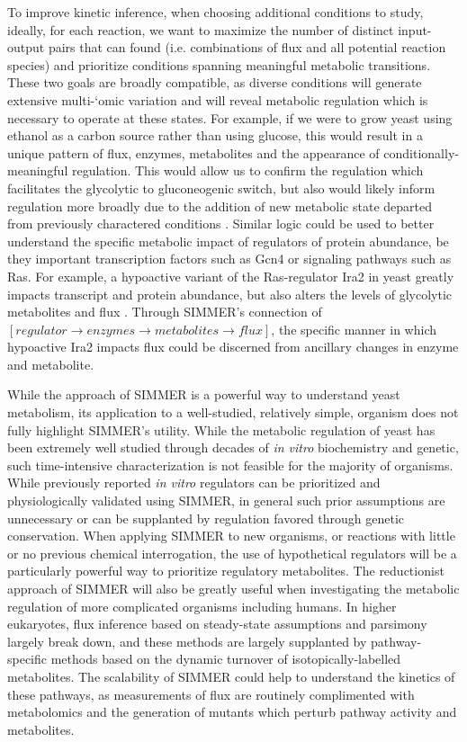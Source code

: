 To improve kinetic inference, when choosing additional conditions to study, ideally, for each reaction, we want to maximize the number of distinct input-output pairs that can found (i.e. combinations of flux and all potential reaction species) and prioritize conditions spanning meaningful metabolic transitions. These two goals are broadly compatible, as diverse conditions will generate extensive multi-`omic variation and will reveal metabolic regulation which is necessary to operate at these states. For example, if we were to grow yeast using ethanol as a carbon source rather than using glucose, this would result in a unique pattern of flux, enzymes, metabolites and the appearance of conditionally-meaningful regulation. This would allow us to confirm the regulation which facilitates the glycolytic to gluconeogenic switch, but also would likely inform regulation more broadly due to the addition of new metabolic state departed from previously charactered conditions \cite{Zampar:2013fr}. Similar logic could be used to better understand the specific metabolic impact of regulators of protein abundance, be they important transcription factors such as Gcn4 or signaling pathways such as Ras.  For example, a hypoactive variant of the Ras-regulator Ira2 in yeast greatly impacts transcript and protein abundance, but also alters the levels of glycolytic metabolites and flux \cite{Breunig:2014bu}. Through SIMMER's connection of $\left[regulator \rightarrow enzymes \rightarrow metabolites \rightarrow flux\right]$, the specific manner in which hypoactive Ira2 impacts flux could be discerned from ancillary changes in enzyme and metabolite. 

While the approach of SIMMER is a powerful way to understand yeast metabolism, its application to a well-studied, relatively simple, organism does not fully highlight SIMMER's utility. While the metabolic regulation of yeast has been extremely well studied through decades of \textit{in vitro} biochemistry and genetic, such time-intensive characterization is not feasible for the majority of organisms.  While previously reported \textit{in vitro} regulators can be prioritized and physiologically validated using SIMMER, in general such prior assumptions are unnecessary or can be supplanted by regulation favored through genetic conservation. When applying SIMMER to new organisms, or reactions with little or no previous chemical interrogation, the use of hypothetical regulators will be a particularly powerful way to prioritize regulatory metabolites. The reductionist approach of SIMMER will also be greatly useful when investigating the metabolic regulation of more complicated organisms including humans. In higher eukaryotes, flux inference based on steady-state assumptions and parsimony largely break down, and these methods are largely supplanted by pathway-specific methods based on the dynamic turnover of isotopically-labelled metabolites. The scalability of SIMMER could help to understand the kinetics of these pathways, as measurements of flux are routinely complimented with metabolomics and the generation of mutants which perturb pathway activity and metabolites.

